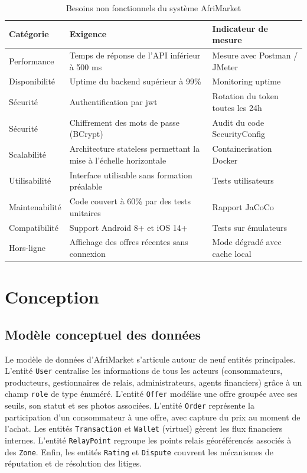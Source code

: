\documentclass[12pt, a4paper, oneside]{report}
\begin{document}
\begin{table}[H]
  \centering
  \caption{Besoins non fonctionnels du système AfriMarket}
  \label{tab:besoins_non_fonctionnels}
  \begin{tabularx}{\textwidth}{|l|X|X|}
    \hline
    \textbf{Catégorie} & \textbf{Exigence} & \textbf{Indicateur de mesure} \\
    \hline
    Performance & Temps de réponse de l'API inférieur à 500 ms & Mesure avec Postman / JMeter \\
    \hline
    Disponibilité & Uptime du backend supérieur à 99\% & Monitoring uptime \\
    \hline
    Sécurité & Authentification par \gls{jwt} & Rotation du token toutes les 24h \\
    \hline
    Sécurité & Chiffrement des mots de passe (BCrypt) & Audit du code SecurityConfig \\
    \hline
    Scalabilité & Architecture stateless permettant la mise à l'échelle horizontale & Containerisation Docker \\
    \hline
    Utilisabilité & Interface utilisable sans formation préalable & Tests utilisateurs \\
    \hline
    Maintenabilité & Code couvert à 60\% par des tests unitaires & Rapport JaCoCo \\
    \hline
    Compatibilité & Support Android 8+ et iOS 14+ & Tests sur émulateurs \\
    \hline
    Hors-ligne & Affichage des offres récentes sans connexion & Mode dégradé avec cache local \\
    \hline
  \end{tabularx}
\end{table}

\section{Conception}

\subsection{Modèle conceptuel des données}

Le modèle de données d'AfriMarket s'articule autour de neuf entités principales. L'entité
\texttt{User} centralise les informations de tous les acteurs (consommateurs, producteurs,
gestionnaires de relais, administrateurs, agents financiers) grâce à un champ
\texttt{role} de type énuméré. L'entité \texttt{Offer} modélise une offre groupée avec
ses seuils, son statut et ses photos associées. L'entité \texttt{Order} représente la
participation d'un consommateur à une offre, avec capture du prix au moment de l'achat.
Les entités \texttt{Transaction} et \texttt{Wallet} (virtuel) gèrent les flux financiers
internes. L'entité \texttt{RelayPoint} regroupe les points relais géoréférencés associés
à des \texttt{Zone}. Enfin, les entités \texttt{Rating} et \texttt{Dispute} couvrent les
mécanismes de réputation et de résolution des litiges.
\end{document}
